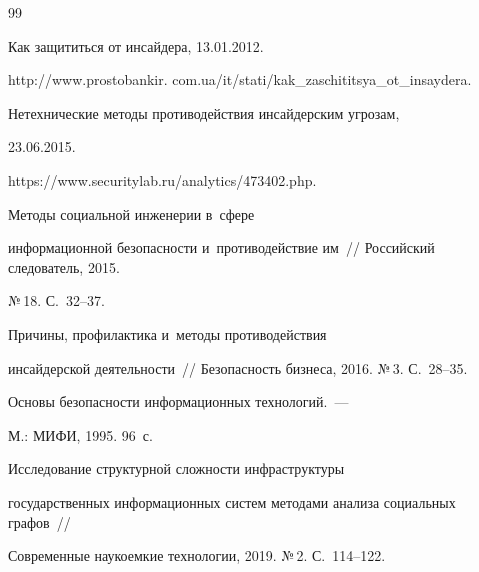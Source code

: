 {\small\frenchspacing


{%




\begin{thebibliography}{99}







 Как защититься от инсайдера, 13.01.2012. {\sf 


http://www.prostobankir. com.ua/it/stati/kak\_zaschititsya\_ot\_insaydera.}




 Нетехнические методы противодействия инсайдерским угрозам,


23.06.2015. {\sf 


https://www.securitylab.ru/analytics/473402.php.}










 Методы социальной инженерии в~сфере 


информационной безопасности и~противодействие им~/\!\!/ Российский следователь, 2015. 


№\,18. С.~32--37.







 Причины, профилактика и~методы противодействия 


инсайдерской деятельности~/\!\!/ Безопасность бизнеса, 2016. №\,3. С.~28--35.





 




 Основы безопасности информационных технологий.~--- 


М.: МИФИ, 1995. 96~с.




 Исследование структурной сложности инфраструктуры 


государственных информационных систем методами анализа социальных графов~/\!\!/ 


Современные наукоемкие технологии, 2019. №\,2. С.~114--122.



\end{thebibliography}}}
